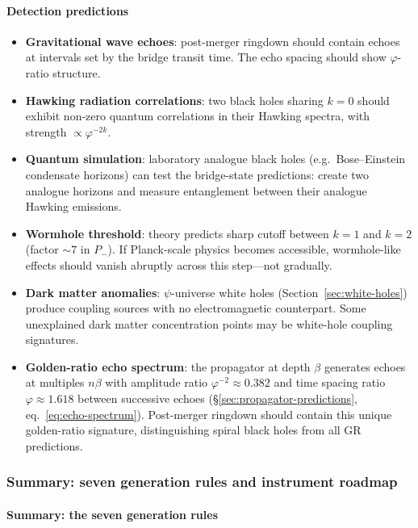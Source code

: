 \documentclass[12pt,a4paper]{article}
\begin{document}
\paragraph{Detection predictions}

\begin{itemize}[nosep]
\item \textbf{Gravitational wave echoes}: post-merger ringdown should contain echoes at intervals set by the bridge transit time. The echo spacing should show $\varphi$-ratio structure.
\item \textbf{Hawking radiation correlations}: two black holes sharing $k = 0$ should exhibit non-zero quantum correlations in their Hawking spectra, with strength $\propto \varphi^{-2k}$.
\item \textbf{Quantum simulation}: laboratory analogue black holes (e.g.\ Bose--Einstein condensate horizons) can test the bridge-state predictions: create two analogue horizons and measure entanglement between their analogue Hawking emissions.
\item \textbf{Wormhole threshold}: theory predicts sharp cutoff between $k = 1$ and $k = 2$ (factor $\sim 7$ in $P_-$). If Planck-scale physics becomes accessible, wormhole-like effects should vanish abruptly across this step---not gradually.
\item \textbf{Dark matter anomalies}: $\psi$-universe white holes (Section~\ref{sec:white-holes}) produce coupling sources with no electromagnetic counterpart.  Some unexplained dark matter concentration points may be white-hole coupling signatures.
\item \textbf{Golden-ratio echo spectrum}: the propagator at depth $\beta$ generates echoes at multiples $n\beta$ with amplitude ratio $\varphi^{-2} \approx 0.382$ and time spacing ratio $\varphi \approx 1.618$ between successive echoes (\S\ref{sec:propagator-predictions}, eq.~\ref{eq:echo-spectrum}). Post-merger ringdown should contain this unique golden-ratio signature, distinguishing spiral black holes from all GR predictions.
\end{itemize}

\subsubsection{Summary: seven generation rules and instrument roadmap}
\label{sec:bh-summary}

\paragraph{Summary: the seven generation rules}
\label{sec:bh-rules}
\end{document}
